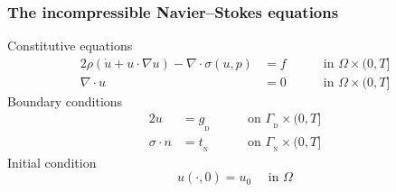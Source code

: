 \begin{frame}
  \frametitle{The incompressible Navier--Stokes equations}

  Constitutive equations
  \begin{alignat*}{2}
    \rho (\dot{u} + u \cdot \nabla u)
    - \nabla \cdot \sigma(u, p) &= f && \quad \text{ in } \Omega \times (0, T] \\
      \nabla \cdot u &= 0 && \quad \text{ in } \Omega \times (0, T]
  \end{alignat*}
  Boundary conditions
  \begin{alignat*}{2}
    u &= g_{_\mathrm{D}} && \quad \text{ on } \Gamma_{_\mathrm{D}} \times (0, T] \\
    \sigma \cdot n &= t_{_\mathrm{N}} && \quad \text{ on } \Gamma_{_\mathrm{N}} \times (0, T]
  \end{alignat*}
  Initial condition
  \begin{equation*}
    u(\cdot, 0) = u_0 \quad \text{ in } \Omega
  \end{equation*}


  \end{frame}

